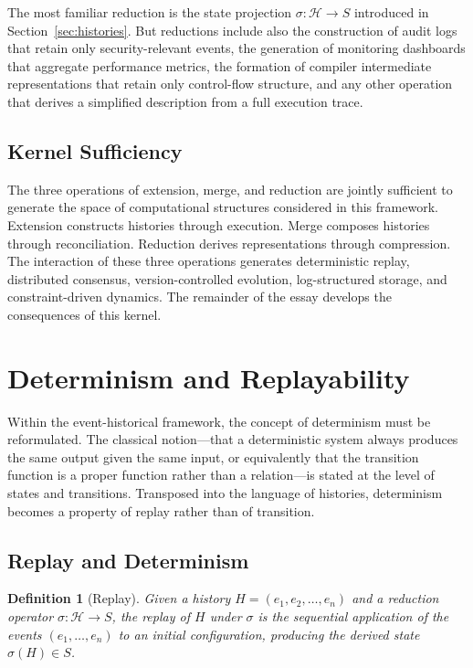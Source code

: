 \documentclass[12pt]{article}
\newtheorem{definition}{Definition}
\begin{document}
The most familiar reduction is the state projection $\sigma : \mathcal{H} \rightarrow S$ introduced in Section~\ref{sec:histories}. But reductions include also the construction of audit logs that retain only security-relevant events, the generation of monitoring dashboards that aggregate performance metrics, the formation of compiler intermediate representations that retain only control-flow structure, and any other operation that derives a simplified description from a full execution trace.

\subsection{Kernel Sufficiency}

The three operations of extension, merge, and reduction are jointly sufficient to generate the space of computational structures considered in this framework. Extension constructs histories through execution. Merge composes histories through reconciliation. Reduction derives representations through compression. The interaction of these three operations generates deterministic replay, distributed consensus, version-controlled evolution, log-structured storage, and constraint-driven dynamics. The remainder of the essay develops the consequences of this kernel.


\section{Determinism and Replayability}
\label{sec:determinism}

Within the event-historical framework, the concept of determinism must be reformulated. The classical notion---that a deterministic system always produces the same output given the same input, or equivalently that the transition function is a proper function rather than a relation---is stated at the level of states and transitions. Transposed into the language of histories, determinism becomes a property of replay rather than of transition.

\subsection{Replay and Determinism}

\begin{definition}[Replay]
Given a history $H = (e_1, e_2, \ldots, e_n)$ and a reduction operator $\sigma : \mathcal{H} \rightarrow S$, the \emph{replay} of $H$ under $\sigma$ is the sequential application of the events $(e_1, \ldots, e_n)$ to an initial configuration, producing the derived state $\sigma(H) \in S$.
\end{definition}
\end{document}

